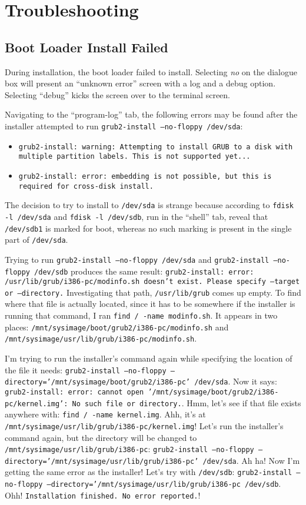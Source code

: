 \documentclass[12pt]{article}
\begin{document}
\section{Troubleshooting}

\subsection{Boot Loader Install Failed}

\qq During installation, the boot loader failed to install. Selecting
\textit{no} on the dialogue box will present an ``unknown error'' screen with a
log and a debug option. Selecting ``debug'' kicks the screen over to the
terminal screen.

\qq Navigating to the ``program-log'' tab, the following errors may be found
after the installer attempted to run {\tt grub2-install --no-floppy /dev/sda}:

\begin{itemize}
\item {\tt grub2-install: warning: Attempting to install GRUB to a disk with multiple
    partition labels. This is not supported yet...}
\item {\tt grub2-install: error: embedding is not possible, but this is required
    for cross-disk install.}
\end{itemize}

The decision to try to install to {\tt /dev/sda} is strange because according to
{\tt fdisk -l /dev/sda} and {\tt fdisk -l /dev/sdb}, run in the ``shell'' tab,
reveal that {\tt /dev/sdb1} is marked for boot, whereas no such marking is
present in the single part of {\tt /dev/sda}.

\qq Trying to run {\tt grub2-install --no-floppy /dev/sda} and {\tt grub2-install
  --no-floppy /dev/sdb} produces the same result: {\tt grub2-install: error:
  /usr/lib/grub/i386-pc/modinfo.sh doesn't exist. Please specify --target or
  --directory.} Investigating that path, {\tt /usr/lib/grub} comes up empty. To
find where that file is actually located, since it has to be somewhere if the
installer is running that command, I ran {\tt find / -name modinfo.sh}. It
appears in two places: {\tt /mnt/sysimage/boot/grub2/i386-pc/modinfo.sh} and
{\tt /mnt/sysimage/usr/lib/grub/i386-pc/modinfo.sh}.

\qq I'm trying to run the installer's command again while specifying the
location of the file it needs: {\tt grub2-install --no-floppy
  --directory='/mnt/sysimage/boot/grub2/i386-pc' /dev/sda}. Now it says:
{\tt grub2-install: error: cannot open
  '/mnt/sysimage/boot/grub2/i386-pc/kernel.img': No such file or
  directory.}. Hmm, let's see if that file exists anywhere with: {\tt find /
  -name kernel.img}. Ahh, it's at
{\tt /mnt/sysimage/usr/lib/grub/i386-pc/kernel.img}! Let's run the installer's
command again, but the directory will be changed to
{\tt /mnt/sysimage/usr/lib/grub/i386-pc}:
{\tt grub2-install --no-floppy --directory='/mnt/sysimage/usr/lib/grub/i386-pc'
  /dev/sda}. Ah ha! Now I'm getting the same error as the installer! Let's try
with {\tt /dev/sdb}: {\tt grub2-install --no-floppy
  --directory='/mnt/sysimage/usr/lib/grub/i386-pc /dev/sdb}. Ohh!
{\tt Installation finished. No error reported.}! 
\end{document}
